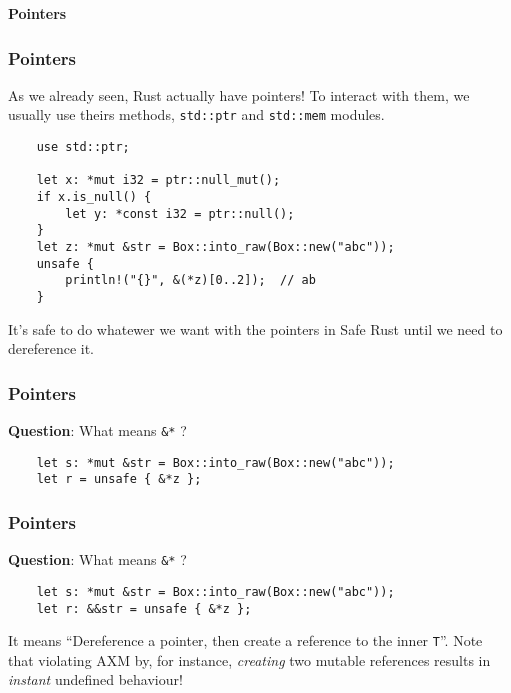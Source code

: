 \documentclass[aspectratio=1610,t]{beamer}
\begin{document}

\begin{frame}[c]
\centering\Huge\textbf{Pointers}
\end{frame}


\begin{frame}[fragile]
\frametitle{Pointers}
As we already seen, Rust actually have pointers! To interact with them, we usually use theirs methods, \texttt{std::ptr} and \texttt{std::mem} modules.

\begin{verbatim}
    use std::ptr;

    let x: *mut i32 = ptr::null_mut();
    if x.is_null() {
        let y: *const i32 = ptr::null();
    }
    let z: *mut &str = Box::into_raw(Box::new("abc"));
    unsafe {
        println!("{}", &(*z)[0..2]);  // ab
    }
\end{verbatim}

It's safe to do whatewer we want with the pointers in Safe Rust until we need to dereference it.
\end{frame}


\begin{frame}[fragile]
\frametitle{Pointers}
\textbf{Question}: What means \texttt{\&*} ?

\begin{verbatim}
    let s: *mut &str = Box::into_raw(Box::new("abc"));
    let r = unsafe { &*z };
\end{verbatim}
\end{frame}


\begin{frame}[fragile]
\frametitle{Pointers}
\textbf{Question}: What means \texttt{\&*} ?

\begin{verbatim}
    let s: *mut &str = Box::into_raw(Box::new("abc"));
    let r: &&str = unsafe { &*z };
\end{verbatim}

It means ``Dereference a pointer, then create a reference to the inner \texttt{T}''. Note that violating AXM by, for instance, \textit{creating} two mutable references results in \textit{instant} undefined behaviour!
\end{frame}
\end{document}

